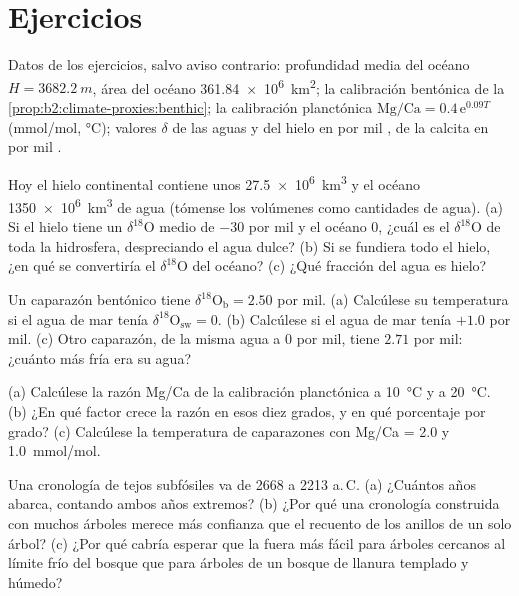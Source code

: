 \section*{Ejercicios}\label{sec:b2:climate-proxies:exercises}

Datos de los ejercicios, salvo aviso contrario: profundidad media del océano $H = \qty{3682.2}{m}$, área del
océano \qty{361.84e6}{km^2}; la calibración bentónica de la \cref{prop:b2:climate-proxies:benthic}; la
calibración planctónica $\text{Mg/Ca} = 0.4\,\mathrm{e}^{0.09T}$ (\unit{mmol/mol}, \unit{\celsius});
valores $\delta$ de las aguas y del hielo en por mil , de la calcita en por mil .

\begin{exercise}[$\star$]\label{exo:b2:climate-proxies:1}
Hoy el hielo continental contiene unos \qty{27.5e6}{km^3} y el océano \qty{1350e6}{km^3} de
agua (tómense los volúmenes como cantidades de agua). (a) Si el hielo tiene un $\delta^{18}$O medio de $-30$ por
mil y el océano 0, ¿cuál es el $\delta^{18}$O de toda la hidrosfera, despreciando el agua
dulce? (b) Si se fundiera todo el hielo, ¿en qué se convertiría el $\delta^{18}$O del océano? (c) ¿Qué
fracción del agua es hielo?
\end{exercise}

\begin{exercise}[$\star$]\label{exo:b2:climate-proxies:2}
Un caparazón bentónico tiene $\delta^{18}\mathrm{O}_{\mathrm{b}} = 2.50$ por mil. (a) Calcúlese su
temperatura si el agua de mar tenía $\delta^{18}\mathrm{O}_{\mathrm{sw}} = 0$. (b) Calcúlese si el
agua de mar tenía $+1.0$ por mil. (c) Otro caparazón, de la misma agua a $0$ por mil, tiene
$2.71$ por mil: ¿cuánto más fría era su agua?
\end{exercise}

\begin{exercise}[$\star$]\label{exo:b2:climate-proxies:3}
(a) Calcúlese la razón Mg/Ca de la calibración planctónica a \qty{10}{\celsius} y a
\qty{20}{\celsius}. (b) ¿En qué factor crece la razón en esos diez grados, y en qué
porcentaje por grado? (c) Calcúlese la temperatura de caparazones con Mg/Ca = 2.0 y
\qty{1.0}{mmol/mol}.
\end{exercise}

\begin{exercise}[$\star$]\label{exo:b2:climate-proxies:4}
Una cronología de tejos subfósiles va de 2668 a 2213 a.\,C. (a) ¿Cuántos años abarca,
contando ambos años extremos? (b) ¿Por qué una cronología construida con muchos árboles merece más confianza que
el recuento de los anillos de un solo árbol? (c) ¿Por qué cabría esperar que la  fuera más fácil para
árboles cercanos al límite frío del bosque que para árboles de un bosque de llanura templado y húmedo?
\end{exercise}

